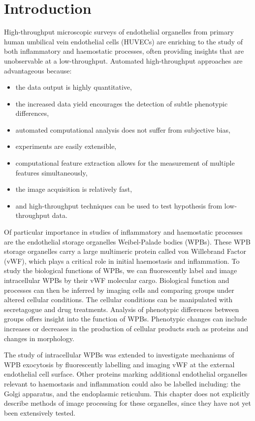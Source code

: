 \section{Introduction}
\label{endothelial_morphometry:introduction}
High-throughput microscopic surveys of endothelial organelles from primary human umbilical vein endothelial cells (HUVECs) are enriching to the study of both inflammatory and haemostatic processes, often providing insights that are unobservable at a low-throughput. Automated high-throughput approaches are advantageous because:
\begin{itemize}\setlength\itemsep{0pt}
	\item the data output is highly quantitative,
	\item the increased data yield encourages the detection of subtle phenotypic differences,
	\item automated computational analysis does not suffer from subjective bias,
	\item experiments are easily extensible,
	\item computational feature extraction allows for the measurement of multiple features simultaneously,
	\item the image acquisition is relatively fast,
	\item and high-throughput techniques can be used to test hypothesis from low-throughput data.
\end{itemize}

Of particular importance in studies of inflammatory and haemostatic processes are the endothelial storage organelles Weibel-Palade bodies (WPBs). These WPB storage organelles carry a large multimeric protein called von Willebrand Factor (vWF), which plays a critical role in initial haemostasis and inflammation. To study the biological functions of WPBs, we can fluorescently label and image intracellular WPBs by their vWF molecular cargo. Biological function and processes can then be inferred by imaging cells and comparing groups under altered cellular conditions. The cellular conditions can be manipulated with secretagogue and drug treatments. Analysis of phenotypic differences between groups offers insight into the function of WPBs. Phenotypic changes can include increases or decreases in the production of cellular products such as proteins and changes in morphology.

The study of intracellular WPBs was extended to investigate mechanisms of WPB exocytosis by fluorescently labelling and imaging vWF at the external endothelial cell surface. Other proteins marking additional endothelial organelles relevant to haemostasis and inflammation could also be labelled including: the Golgi apparatus, and the endoplasmic reticulum. This chapter does not explicitly describe methods of image processing for these organelles, since they have not yet been extensively tested.

